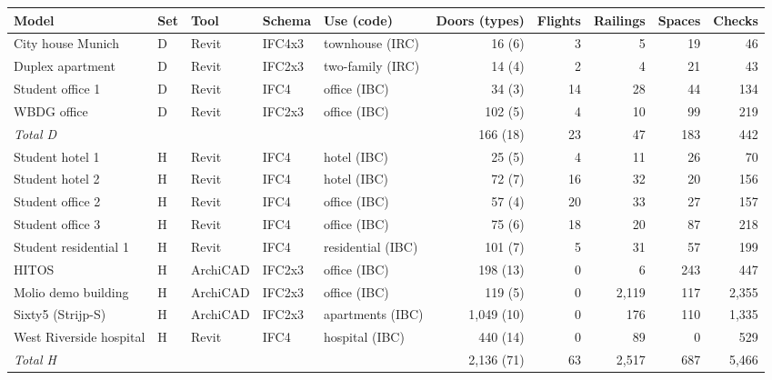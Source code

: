 \begin{tabular}{@{}lllllrrrrr@{}}
\toprule
Model & Set & Tool & Schema & Use (code) & Doors (types) & Flights & Railings & Spaces & Checks \\
\midrule
City house Munich & D & Revit & IFC4x3 & townhouse (IRC) & 16 (6) & 3 & 5 & 19 & 46 \\
Duplex apartment & D & Revit & IFC2x3 & two-family (IRC) & 14 (4) & 2 & 4 & 21 & 43 \\
Student office 1 & D & Revit & IFC4 & office (IBC) & 34 (3) & 14 & 28 & 44 & 134 \\
WBDG office & D & Revit & IFC2x3 & office (IBC) & 102 (5) & 4 & 10 & 99 & 219 \\
\emph{Total D} & & & & & 166 (18) & 23 & 47 & 183 & 442 \\
\addlinespace
Student hotel 1 & H & Revit & IFC4 & hotel (IBC) & 25 (5) & 4 & 11 & 26 & 70 \\
Student hotel 2 & H & Revit & IFC4 & hotel (IBC) & 72 (7) & 16 & 32 & 20 & 156 \\
Student office 2 & H & Revit & IFC4 & office (IBC) & 57 (4) & 20 & 33 & 27 & 157 \\
Student office 3 & H & Revit & IFC4 & office (IBC) & 75 (6) & 18 & 20 & 87 & 218 \\
Student residential 1 & H & Revit & IFC4 & residential (IBC) & 101 (7) & 5 & 31 & 57 & 199 \\
HITOS & H & ArchiCAD & IFC2x3 & office (IBC) & 198 (13) & 0 & 6 & 243 & 447 \\
Molio demo building & H & ArchiCAD & IFC2x3 & office (IBC) & 119 (5) & 0 & 2,119 & 117 & 2,355 \\
Sixty5 (Strijp-S) & H & ArchiCAD & IFC2x3 & apartments (IBC) & 1,049 (10) & 0 & 176 & 110 & 1,335 \\
West Riverside hospital & H & Revit & IFC4 & hospital (IBC) & 440 (14) & 0 & 89 & 0 & 529 \\
\emph{Total H} & & & & & 2,136 (71) & 63 & 2,517 & 687 & 5,466 \\
\bottomrule
\end{tabular}
